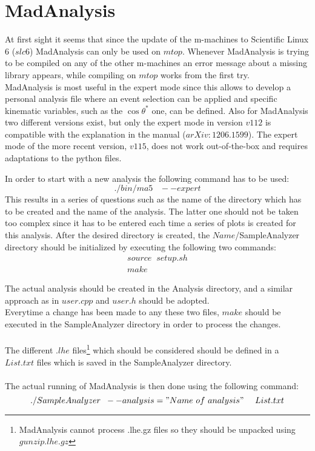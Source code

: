 \section{MadAnalysis}
At first sight it seems that since the update of the m-machines to Scientific Linux 6 ($slc6$) MadAnalysis can only be used on $mtop$. Whenever MadAnalysis is trying to be compiled on any of the other m-machines an error message about a missing library appears, while compiling on $mtop$ works from the first try.\\

MadAnalysis is most useful in the expert mode since this allows to develop a personal analysis file where an event selection can be applied and specific kinematic variables, such as the $\cos \theta^{*}$ one, can be defined. Also for MadAnalysis two different versions exist, but only the expert mode in version $v112$ is compatible with the explanation in the manual ($arXiv: 1206.1599$). The expert mode of the more recent version, $v115$, does not work out-of-the-box and requires adaptations to the python files.

In order to start with a new analysis the following command has to be used:
\begin{equation}
  ./bin/ma5 \; \; \; --expert
\end{equation}
This results in a series of questions such as the name of the directory which has to be created and the name of the analysis.
The latter one should not be taken too complex since it has to be entered each time a series of plots is created for this analysis.
After the desired directory is created, the $Name$/SampleAnalyzer directory should be initialized by executing the following two commands:
\begin{eqnarray}
  source \; \; setup.sh \\
  make
\end{eqnarray}

The actual analysis should be created in the Analysis directory, and a similar approach as in $user.cpp$ and $user.h$ should be adopted.\\
Everytime a change has been made to any these two files, $make$ should be executed in the SampleAnalyzer directory in order to process the changes.\\
\\
The different $.lhe$ files\footnote{MadAnalysis cannot process .lhe.gz files so they should be unpacked using $gunzip .lhe.gz$} which should be considered should be defined in a $List.txt$ files which is saved in the SampleAnalyzer directory. \\
\\
The actual running of MadAnalysis is then done using the following command:
\begin{equation}
  ./SampleAnalyzer \; \; --analysis="Name ~ of ~ analysis" ~~~~ List.txt
\end{equation}

